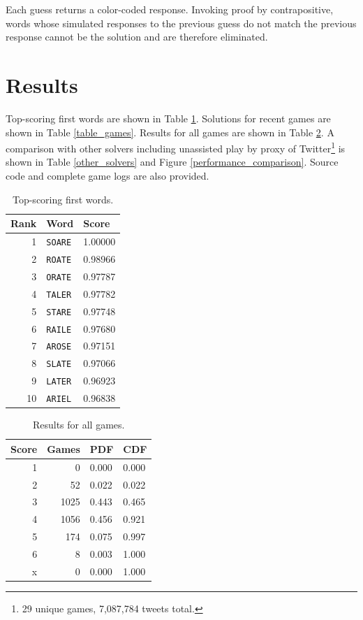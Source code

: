 \documentclass[twocolumn]{tudelft-aiaa}
\begin{document}
Each guess returns a color-coded response. Invoking proof by contrapositive, words whose simulated responses to the previous guess do not match the previous response cannot be the solution and are therefore eliminated.

\section{Results}

Top-scoring first words are shown in Table \ref{table_words}. Solutions for recent games are shown in Table \ref{table_games}. Results for all games are shown in Table \ref{table_results}. A comparison with other solvers including unassisted play by proxy of Twitter\footnote{29 unique games, 7,087,784 tweets total.} is shown in Table \ref{other_solvers} and Figure \ref{performance_comparison}.\cite{WordleStats} Source code and complete game logs are also provided.\cite{Dichter}

\begin{table}[h!]
\begin{centering}
\begin{tabular}{ r | l | l}
\bf Rank & \bf Word & \bf Score\\
\hline
1  & \texttt{SOARE} & 1.00000 \\
2  & \texttt{ROATE} & 0.98966 \\
3  & \texttt{ORATE} & 0.97787 \\
4  & \texttt{TALER} & 0.97782 \\
5  & \texttt{STARE} & 0.97748 \\
6  & \texttt{RAILE} & 0.97680 \\
7  & \texttt{AROSE} & 0.97151 \\
8  & \texttt{SLATE} & 0.97066 \\
9  & \texttt{LATER} & 0.96923 \\
10 & \texttt{ARIEL} & 0.96838 \\
\end{tabular}
\vspace{2 mm}
\caption{Top-scoring first words.}
\label{table_words}
\end{centering}
\end{table}

\begin{table}[h!]
\begin{centering}
\begin{tabular}{ r | r | l | l}
\bf Score & \bf Games & \bf PDF & \bf CDF\\
\hline
1 & 0 & 0.000 & 0.000\\
2 & 52 & 0.022 & 0.022\\
3 & 1025 & 0.443 & 0.465\\
4 & 1056 & 0.456 & 0.921\\
5 & 174 & 0.075 & 0.997\\
6 & 8 & 0.003 & 1.000\\
x & 0 & 0.000 & 1.000\\
\end{tabular}
\vspace{2 mm}
\caption{Results for all games.}
\label{table_results}
\end{centering}
\end{table}
\end{document}
